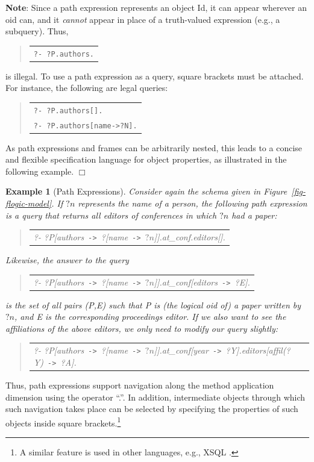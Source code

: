 \documentclass[11pt]{article}
\newcommand{\ERGO}{\mbox{\smaller{\ensuremath{\cal{E}}\smaller{{\sc{RGO}}}}}\xspace}
\newcommand{\FLSYSTEM}{\ERGO}
\newtheorem{example}{Example}[section]
\newenvironment{qrules}{\begin{quote}\tt\begin{tabular}[t]{l}}%
{\end{tabular}\end{quote}}
\newcommand{\mvd}{{\mbox{\tt \,->\,}}}  %
\newcommand{\anon}{?}
\begin{document}
\noindent
{\bf Note}: Since a path expression represents an object Id,
it can appear wherever an oid can, and it \emph{cannot} appear in
place of a truth-valued expression (e.g., a subquery).
Thus,
\begin{qrules}
\tt ?- ?P.authors.
\end{qrules}
is illegal. To use a path expression as a
query, square brackets must be attached. For instance, the following are
legal queries:
\begin{qrules}
   \tt ?- ?P.authors[]. \\
   \tt ?- ?P.authors[name->?N].
\end{qrules}
\noindent
As path expressions and frames can be arbitrarily nested, this leads
to a concise and flexible specification language for object properties, as
illustrated in the following example.
   \hfill$\Box$

\begin{example}[Path Expressions]\label{Ex:PathExpr}
  \rm Consider again the schema given in Figure~\ref{fig-flogic-model}.  If
  $?n$ represents the name of a person, the following path expression is a query
  that returns all editors of conferences in which $?n$ had a paper:
  \begin{qrules}
   ?- ?P[authors\mvd\anon [name\mvd $?n$]].at\_conf.editors[].
  \end{qrules}
  Likewise, the answer to the query
  \begin{qrules}
   ?- ?P[authors\mvd\anon [name\mvd $?n$]].at\_conf[editors\mvd?E].
  \end{qrules}
  is the set of all pairs (\textsf{P},\textsf{E}) such that \textsf{P} is
  (the logical oid of) a paper written by $?n$, and \textsf{E} is the
  corresponding proceedings editor.  If we also want to see the
  affiliations of the above editors, we only need to modify our query
  slightly:
  \begin{qrules}
   ?- ?P[authors\mvd\anon [name\mvd $?n$]].at\_conf[year\mvd ?Y].editors[affil(?Y)\mvd ?A].
  \end{qrules}
\end{example}
Thus, \FLSYSTEM path expressions support navigation 
along the method application dimension using the operator
``.''.
In addition, intermediate objects through which such navigation
takes place can be selected by specifying the properties of such objects
inside square brackets.\footnote{
  A similar feature is used in other languages, e.g., XSQL \cite{xsql-92}.
  }
\end{document}
